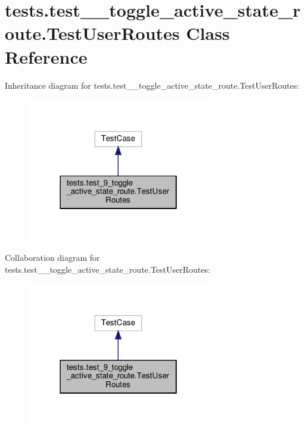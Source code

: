 \hypertarget{classtests_1_1test__9__toggle__active__state__route_1_1_test_user_routes}{}\section{tests.\+test\+\_\+\_\+toggle\+\_\+active\+\_\+state\+\_\+route.\+Test\+User\+Routes Class Reference}
\label{classtests_1_1test__9__toggle__active__state__route_1_1_test_user_routes}


Inheritance diagram for tests.\+test\+\_\+\_\+toggle\+\_\+active\+\_\+state\+\_\+route.\+Test\+User\+Routes\+:\nopagebreak
\begin{figure}[H]
\begin{center}
\leavevmode
\includegraphics[width=226pt]{classtests_1_1test__9__toggle__active__state__route_1_1_test_user_routes__inherit__graph}
\end{center}
\end{figure}


Collaboration diagram for tests.\+test\+\_\+\_\+toggle\+\_\+active\+\_\+state\+\_\+route.\+Test\+User\+Routes\+:\nopagebreak
\begin{figure}[H]
\begin{center}
\leavevmode
\includegraphics[width=226pt]{classtests_1_1test__9__toggle__active__state__route_1_1_test_user_routes__coll__graph}
\end{center}
\end{figure}
